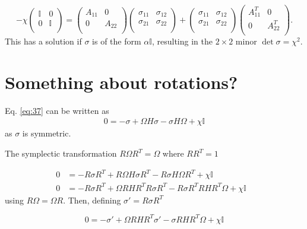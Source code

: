 \documentclass[11pt,a4paper]{article}
\numberwithin{equation}{section}
\begin{document}
	\begin{equation*}
	 -\chi \begin{pmatrix}
	\mathbb{I} & 0  \\
	0 & \mathbb{I}\\
	\end{pmatrix} = \begin{pmatrix}
	A_{11} & 0  \\
	0 & A_{22}\\
	\end{pmatrix}\begin{pmatrix}
	\sigma_{11} & \sigma_{12}  \\
	\sigma_{21} & \sigma_{22}\\
	\end{pmatrix} + \begin{pmatrix}
	\sigma_{11} & \sigma_{12}  \\
	\sigma_{21} & \sigma_{22}\\
	\end{pmatrix}\begin{pmatrix}
	A_{11}^T & 0  \\
	0 & A_{22}^T\\
	\end{pmatrix}.
	\end{equation*}
	This has a solution if $\sigma$ is of the form $\alpha \mathbb{I}$, resulting in the $2 \times 2$ minor $\det \sigma = \chi^2$.
		
 	\iffalse
	\section{Something about rotations?}
	 
	Eq. \ref{eq:37} can be written as
	\begin{align*} 
	0 = -\sigma + \Omega H\sigma -\sigma H\Omega + \chi \mathbb{I} 
	\end{align*} as $\sigma$ is symmetric. 
	
	The symplectic transformation $R\Omega R^{T} = \Omega$ where $RR^{T}=1$

	\begin{align*} 
	0 &= -R\sigma R^{T} + R\Omega H\sigma R^{T} - R\sigma H\Omega R^{T} + \chi \mathbb{I}&\\
	0 &= -R\sigma R^{T} + \Omega R H R^T R \sigma R^{T} - R\sigma R^{T} RH R^T\Omega + \chi \mathbb{I}& 
	\end{align*}	using $R\Omega = \Omega R$. Then, defining $\sigma' = R\sigma R^T$
	
	\begin{equation*} 
	0 = -\sigma' + \Omega R H R^T \sigma' - \sigma RH R^T\Omega + \chi \mathbb{I}
	\end{equation*}
	
\end{document}
